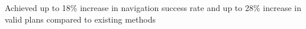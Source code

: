 \begin{cventries}
{\begin{cvitems}
      \item {Achieved up to 18\% increase in navigation success rate and up to 28\% increase in valid plans compared to existing methods}
    \end{cvitems}
    }
\end{cventries}








